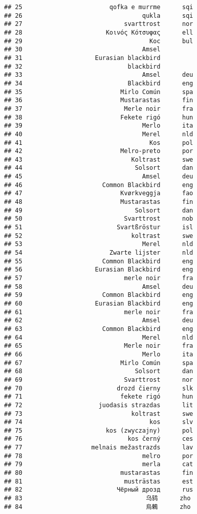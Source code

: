 \documentclass[]{article}
\begin{document}
\begin{verbatim}
## 25                        qofka e murrme      sqi
## 26                                 qukla      sqi
## 27                            svarttrost      nor
## 28                       Κοινός Κότσυφας      ell
## 29                                   Кос      bul
## 30                                 Amsel         
## 31                    Eurasian blackbird         
## 32                             blackbird         
## 33                                 Amsel      deu
## 34                             Blackbird      eng
## 35                           Mirlo Común      spa
## 36                           Mustarastas      fin
## 37                            Merle noir      fra
## 38                           Fekete rigó      hun
## 39                                 Merlo      ita
## 40                                 Merel      nld
## 41                                   Kos      pol
## 42                           Melro-preto      por
## 43                              Koltrast      swe
## 44                               Solsort      dan
## 45                                 Amsel      deu
## 46                      Common Blackbird      eng
## 47                           Kvørkveggja      fao
## 48                           Mustarastas      fin
## 49                               Solsort      dan
## 50                            Svarttrost      nob
## 51                          Svartßröstur      isl
## 52                              koltrast      swe
## 53                                 Merel      nld
## 54                        Zwarte lijster      nld
## 55                      Common Blackbird      eng
## 56                    Eurasian Blackbird      eng
## 57                            merle noir      fra
## 58                                 Amsel      deu
## 59                      Common Blackbird      eng
## 60                    Eurasian Blackbird      eng
## 61                            merle noir      fra
## 62                                 Amsel      deu
## 63                      Common Blackbird      eng
## 64                                 Merel      nld
## 65                            Merle noir      fra
## 66                                 Merlo      ita
## 67                           Mirlo Común      spa
## 68                               Solsort      dan
## 69                            Svarttrost      nor
## 70                          drozd čierny      slk
## 71                           fekete rigó      hun
## 72                     juodasis strazdas      lit
## 73                              koltrast      swe
## 74                                   kos      slv
## 75                       kos (zwyczajny)      pol
## 76                             kos černý      ces
## 77                   melnais mežastrazds      lav
## 78                                 melro      por
## 79                                 merla      cat
## 80                           mustarastas      fin
## 81                            musträstas      est
## 82                          Чёрный дрозд      rus
## 83                                  乌鸫      zho
## 84                                  烏鶇      zho
\end{verbatim}
\end{document}
